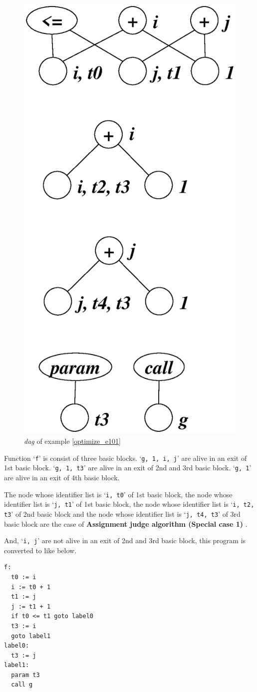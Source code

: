 \begin{Example}
\begin{figure}[htbp]
\begin{center}
\begin{latexonly}
\includegraphics[width=0.556\linewidth,height=1.1\linewidth]{opt044.eps}
\end{latexonly}
\caption{{\em dag} of example \ref{optimize_e101}}
\label{optimize_e102}
\end{center}
\end{figure}
Function `{\tt{f}}' is consist of three basic blocks.
`{\tt{g, 1, i, j}}' are
alive in an exit of 1st basic block.
`{\tt{g, 1, t3}}' are
alive in an exit of 2nd and 3rd basic block.
`{\tt{g, 1}}' are
alive in an exit of 4th basic block.

The node whose identifier list is `{\tt{i, t0}}' of 1st basic block,
the node whose identifier list is `{\tt{j, t1}}' of 1st basic block,
the node whose identifier list is `{\tt{i, t2, t3}}' of 2nd basic block
and the node whose identifier list is `{\tt{j, t4, t3}}' of 3rd basic block
are the case of {\bf Assignment judge algorithm (Special case 1) }.

And, `{\tt{i, j}}' are not alive in an exit of 2nd and 3rd basic block,
this program is converted to like below.
\begin{verbatim}
f:
  t0 := i
  i := t0 + 1
  t1 := j
  j := t1 + 1
  if t0 <= t1 goto label0
  t3 := i
  goto label1
label0:
  t3 := j
label1:
  param t3
  call g
\end{verbatim}
\end{Example}

